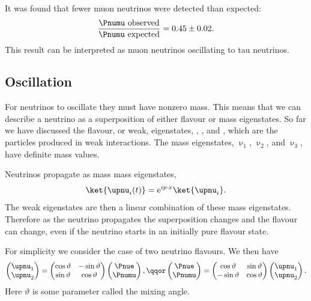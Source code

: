 \documentclass[fleqn]{NotesClass}
\newcommand*{\e}{\mathrm{e}}
\begin{document}
    It was found that fewer muon neutrinos were detected than expected:
    \begin{equation}
        \frac{\Pnumu \text{ observed}}{\Pnumu \text{ expected}} = 0.45 \pm 0.02.
    \end{equation}
    This result can be interpreted as muon neutrinos oscillating to tau neutrinos.
    
    \subsection{Oscillation}
    For neutrinos to oscillate they must have nonzero mass.
    This means that we can describe a neutrino as a superposition of either flavour or mass eigenstates.
    So far we have discussed the flavour, or weak, eigenstates, \Pnue, \Pnumu, and \Pnutau, which are the particles produced in weak interactions.
    The mass eigenstates, \(\upnu_1\), \(\upnu_2\), and \(\upnu_3\), have definite mass values.
    
    Neutrinos propagate as mass mass eigenstates,
    \begin{equation}
        \ket{\upnu_i(t)} = \e^{ip\cdot x}\ket{\upnu_i}.
    \end{equation}
    The weak eigenstates are then a linear combination of these mass eigenstates.
    Therefore as the neutrino propagates the superposition changes and the flavour can change, even if the neutrino starts in an initially pure flavour state.
    
    For simplicity we consider the case of two neutrino flavours.
    We then have
    \begin{equation}
        \begin{pmatrix}
            \upnu_1\\ \upnu_2
        \end{pmatrix}
        =
        \begin{pmatrix}
            \cos\vartheta & -\sin\vartheta\\
            \sin\vartheta & \cos\vartheta
        \end{pmatrix}
        \begin{pmatrix}
            \Pnue\\ \Pnumu
        \end{pmatrix}
        , \qqor 
        \begin{pmatrix}
            \Pnue\\ \Pnumu
        \end{pmatrix}
        =
        \begin{pmatrix}
            \cos\vartheta & \sin\vartheta\\
            -\sin\vartheta & \cos\vartheta
        \end{pmatrix}
        \begin{pmatrix}
            \upnu_1\\ \upnu_2
        \end{pmatrix}
        .
    \end{equation}
    Here \(\vartheta\) is some parameter called the mixing angle.
    
\end{document}
